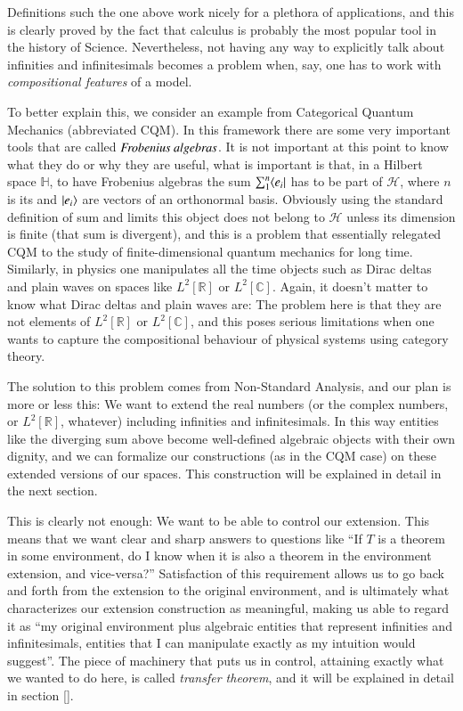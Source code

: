 \documentclass[adraft, copyright,creativecommons,sharealike,noncommercial]{Preambles/eptcs}
\begin{document}
Definitions such the one above work nicely for a plethora of applications, and this is clearly proved by the fact that calculus is probably the most popular tool in the history of Science. Nevertheless, not having any way to explicitly talk about infinities and infinitesimals becomes a problem when, say, one has to work with \emph{compositional features} of a model. 

To better explain this, we consider an example from Categorical Quantum Mechanics (abbreviated CQM). In this framework there are some very important tools that are called $\emph{Frobenius algebras}$. It is not important at this point to know what they do or why they are useful, what is important is that, in a Hilbert space $\mathbb{H}$, to have Frobenius algebras the sum $\sum_1^n \langle e_i \vert$ has to be part of $\mathcal{H}$, where $n$ is its and $\vert e_i \rangle$ are vectors of an orthonormal basis. Obviously using the standard definition of sum and limits this object does not belong to $\mathcal{H}$ unless its dimension is finite (that sum is divergent), and this is a problem that essentially relegated CQM to the study of finite-dimensional quantum mechanics for long time. Similarly, in physics one manipulates all the time objects such as Dirac deltas and plain waves on spaces like $L^2[\mathbb{R}]$ or $L^2[\mathbb{C}]$. Again, it doesn't matter to know what Dirac deltas and plain waves are: The problem here is that they are not elements of $L^2[\mathbb{R}]$ or $L^2[\mathbb{C}]$, and this poses serious limitations when one wants to capture the compositional behaviour of physical systems using category theory.

The solution to this problem comes from Non-Standard Analysis, and our plan is more or less this: We want to extend the real numbers (or the complex numbers, or $L^2[\mathbb{R}]$, whatever) including infinities and infinitesimals. In this way entities like the diverging sum above become well-defined algebraic objects with their own dignity, and we can formalize our constructions (as in the CQM case) on these extended versions of our spaces. This construction will be explained in detail in the next section.

This is clearly not enough: We want to be able to control our extension. This means that we want clear and sharp answers to questions like ``If $T$ is a theorem in some environment, do I know when it is also a theorem in the environment extension, and vice-versa?'' Satisfaction of this requirement allows us to go back and forth from the extension to the original environment, and is ultimately what characterizes our extension construction as meaningful, making us able to regard it as ``my original environment plus algebraic entities that represent infinities and infinitesimals, entities that I can manipulate exactly as my intuition would suggest''. The piece of machinery that puts us in control, attaining exactly what we wanted to do here, is called \emph{transfer theorem}, and it will be explained in detail in section []. 
\end{document}
